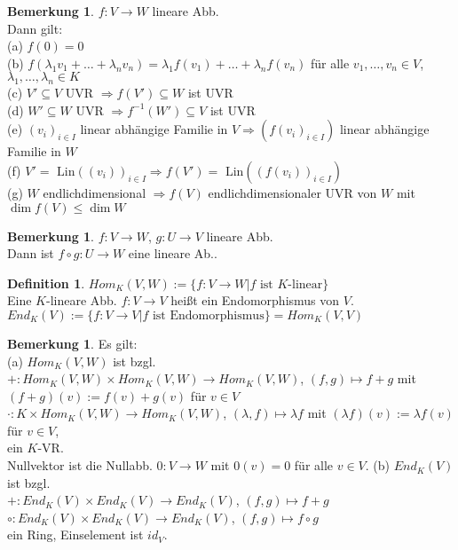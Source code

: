 \documentclass[10pt,a4paper,numbers=endperiod]{scrartcl}
\theoremstyle{definition}
\newtheorem{defi}[satz]{Definition}
\newtheorem{bem}[satz]{Bemerkung}
\begin{document}
 \begin{bem}
 	$f: V \rightarrow W$ lineare Abb.\\
 	Dann gilt:\\
 	(a) $f(0)=0$\\
 	(b) $f(\lambda_1v_1+\ldots+\lambda_nv_n) = \lambda_1 f(v_1)+\ldots+\lambda_nf(v_n)$ für alle $v_1,\ldots,v_n \in V$, $\lambda_1,\ldots,\lambda_n \in K$\\
 	(c) $V' \subseteq V$ UVR $\Rightarrow f(V') \subseteq W$ ist UVR\\
 	(d) $W' \subseteq W$ UVR $\Rightarrow f^{-1}(W') \subseteq V$ ist UVR\\
 	(e) $(v_i)_{i\in I}$ linear abhängige Familie in $V \Rightarrow (f(v_i)_{i\in I})$ linear abhängige Familie in $W$\\
 	(f) $V' = \text{ Lin}((v_i))_{i\in I} \Rightarrow f(V') = \text{ Lin}((f(v_i))_{i \in I})$\\
 	(g) $W$ endlichdimensional $\Rightarrow f(V)$ endlichdimensionaler UVR von $W$ mit $\dim f(V) \leq \dim W$
 \end{bem}

\begin{bem}
	$f:V \rightarrow W$, $g:U \rightarrow V$ lineare Abb.\\
	Dann ist $f \circ g: U \rightarrow W$ eine lineare Ab..
\end{bem}

\begin{defi}
	$Hom_K(V,W) := \{f: V \rightarrow W| f \text{ ist $K$-linear}\}$\\
	Eine $K$-lineare Abb. $f:V\rightarrow V$ heißt ein Endomorphismus von $V$.\\
	$End_K(V) := \{f: V \rightarrow V| f \text{ ist Endomorphismus}\} = Hom_K(V,V)$
\end{defi}

\begin{bem}
	Es gilt:\\
	(a) $Hom_K(V,W)$ ist bzgl.\\
	$+:Hom_K(V,W) \times Hom_K(V,W) \rightarrow Hom_K(V,W)$, $(f,g) \mapsto f+g$ mit $(f+g)(v) := f(v)+g(v)$ für $v \in V$\\
	$\cdot : K \times Hom_K(V,W) \rightarrow Hom_K(V,W)$, $(\lambda,f) \mapsto \lambda f$ mit $(\lambda f) (v) := \lambda f(v)$ für $v \in V$,\\
	ein $K$-VR.\\
	Nullvektor ist die Nullabb. $0: V \rightarrow W$ mit $0(v) = 0$ für alle $v\in V$.
	(b) $End_K (V)$ ist bzgl.\\
	$+: End_K(V) \times End_K(V) \rightarrow End_K(V)$, $(f,g) \mapsto f+g$\\
	$\circ: End_K(V) \times End_K (V) \rightarrow End_K (V)$, $(f,g) \mapsto f \circ g$\\
	ein Ring, Einselement ist $id_V$.
\end{bem}
\end{document}
